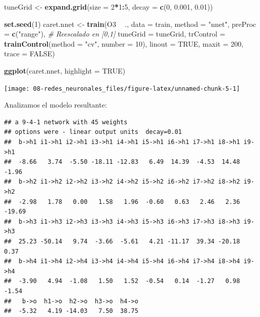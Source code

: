 \documentclass[
]{book}
\newenvironment{Shaded}{\begin{snugshade}}{\end{snugshade}}
\newcommand{\CommentTok}[1]{\textcolor[rgb]{0.56,0.35,0.01}{\textit{#1}}}
\newcommand{\DataTypeTok}[1]{\textcolor[rgb]{0.13,0.29,0.53}{#1}}
\newcommand{\DecValTok}[1]{\textcolor[rgb]{0.00,0.00,0.81}{#1}}
\newcommand{\FloatTok}[1]{\textcolor[rgb]{0.00,0.00,0.81}{#1}}
\newcommand{\KeywordTok}[1]{\textcolor[rgb]{0.13,0.29,0.53}{\textbf{#1}}}
\newcommand{\NormalTok}[1]{#1}
\newcommand{\OperatorTok}[1]{\textcolor[rgb]{0.81,0.36,0.00}{\textbf{#1}}}
\newcommand{\OtherTok}[1]{\textcolor[rgb]{0.56,0.35,0.01}{#1}}
\newcommand{\StringTok}[1]{\textcolor[rgb]{0.31,0.60,0.02}{#1}}
\theoremstyle{break}
\theoremstyle{definition}
\theoremstyle{definition}
\theoremstyle{definition}
\theoremstyle{remark}
\begin{document}
\begin{Shaded}
\begin{Highlighting}[]
\NormalTok{tuneGrid <-}\StringTok{ }\KeywordTok{expand.grid}\NormalTok{(}\DataTypeTok{size =} \DecValTok{2}\OperatorTok{*}\DecValTok{1}\OperatorTok{:}\DecValTok{5}\NormalTok{, }\DataTypeTok{decay =} \KeywordTok{c}\NormalTok{(}\DecValTok{0}\NormalTok{, }\FloatTok{0.001}\NormalTok{, }\FloatTok{0.01}\NormalTok{))}

\KeywordTok{set.seed}\NormalTok{(}\DecValTok{1}\NormalTok{)}
\NormalTok{caret.nnet <-}\StringTok{ }\KeywordTok{train}\NormalTok{(O3 }\OperatorTok{~}\StringTok{ }\NormalTok{., }\DataTypeTok{data =}\NormalTok{ train, }\DataTypeTok{method =} \StringTok{"nnet"}\NormalTok{,}
             \DataTypeTok{preProc =} \KeywordTok{c}\NormalTok{(}\StringTok{"range"}\NormalTok{), }\CommentTok{# Reescalado en [0,1]}
             \DataTypeTok{tuneGrid =}\NormalTok{ tuneGrid,}
             \DataTypeTok{trControl =} \KeywordTok{trainControl}\NormalTok{(}\DataTypeTok{method =} \StringTok{"cv"}\NormalTok{, }\DataTypeTok{number =} \DecValTok{10}\NormalTok{), }
             \DataTypeTok{linout =} \OtherTok{TRUE}\NormalTok{, }\DataTypeTok{maxit =} \DecValTok{200}\NormalTok{, }\DataTypeTok{trace =} \OtherTok{FALSE}\NormalTok{)}

\KeywordTok{ggplot}\NormalTok{(caret.nnet, }\DataTypeTok{highlight =} \OtherTok{TRUE}\NormalTok{)}
\end{Highlighting}
\end{Shaded}

\begin{center}\texttt{[image: 08-redes\_neuronales\_files/figure-latex/unnamed-chunk-5-1]} \end{center}

Analizamos el modelo resultante:

\begin{Shaded}
\end{Shaded}

\begin{verbatim}
## a 9-4-1 network with 45 weights
## options were - linear output units  decay=0.01
##  b->h1 i1->h1 i2->h1 i3->h1 i4->h1 i5->h1 i6->h1 i7->h1 i8->h1 i9->h1 
##  -8.66   3.74  -5.50 -18.11 -12.83   6.49  14.39  -4.53  14.48  -1.96 
##  b->h2 i1->h2 i2->h2 i3->h2 i4->h2 i5->h2 i6->h2 i7->h2 i8->h2 i9->h2 
##  -2.98   1.78   0.00   1.58   1.96  -0.60   0.63   2.46   2.36 -19.69 
##  b->h3 i1->h3 i2->h3 i3->h3 i4->h3 i5->h3 i6->h3 i7->h3 i8->h3 i9->h3 
##  25.23 -50.14   9.74  -3.66  -5.61   4.21 -11.17  39.34 -20.18   0.37 
##  b->h4 i1->h4 i2->h4 i3->h4 i4->h4 i5->h4 i6->h4 i7->h4 i8->h4 i9->h4 
##  -3.90   4.94  -1.08   1.50   1.52  -0.54   0.14  -1.27   0.98  -1.54 
##   b->o  h1->o  h2->o  h3->o  h4->o 
##  -5.32   4.19 -14.03   7.50  38.75
\end{verbatim}
\end{document}

